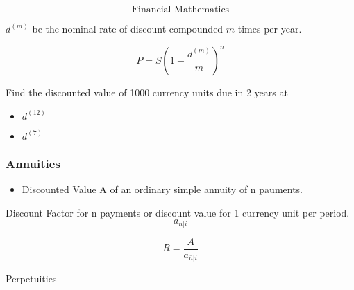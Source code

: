 \documentclass{beamer}
\begin{document}
\begin{frame}
\Large
\[\mbox{Financial Mathematics}\]
\end{frame}
\begin{frame}
$d^{(m)}$ be the nominal rate of discount compounded $m$ times per year.

\[P = S\left( 1- \frac{d^{(m)}}{m}  \right)^n \]
\end{frame}
\begin{frame}
Find the discounted value of 1000 currency units due in 2 years at
\begin{itemize}
\item $d^{(12)}$
\item $d^{(7)}$
\end{itemize}
\end{frame}
\begin{frame}
\frametitle{Annuities}
\begin{itemize}
\item Discounted Value A of an ordinary simple annuity of n pauments.
\end{itemize}
Discount Factor for n payments or discount value for 1 currency unit per period.
\[a_{\bar{n}|i}\]


\[R = \frac{A}{a_{\bar{n}|i}}\]
\end{frame}
\begin{frame}
Perpetuities
\end{frame}
\end{document}
